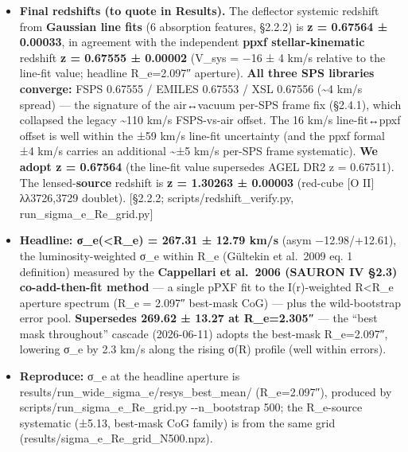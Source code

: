 \documentclass[
]{article}
\providecommand{\tightlist}{%
  \setlength{\itemsep}{0pt}\setlength{\parskip}{0pt}}
\newcommand{\BreakablePath}[1]{{\ttfamily\sloppy #1}}
\begin{document}
\begin{itemize}
\tightlist
\item
  \textbf{Final redshifts (to quote in Results).} The deflector systemic
  redshift from \textbf{Gaussian line fits} (6 absorption features,
  §2.2.2) is \textbf{z = 0.67564 ± 0.00033}, in agreement with the
  independent \textbf{ppxf stellar-kinematic} redshift \textbf{z =
  0.67555 ± 0.00002} (V\_sys = −16 ± 4 km/s relative to the line-fit
  value; headline R\_e=2.097″ aperture). \textbf{All three SPS libraries
  converge:} FSPS 0.67555 / EMILES 0.67553 / XSL 0.67556
  (\textasciitilde4 km/s spread) --- the signature of the air↔vacuum
  per-SPS frame fix (§2.4.1), which collapsed the legacy
  \textasciitilde110 km/s FSPS-vs-air offset. The 16 km/s line-fit↔ppxf
  offset is well within the ±59 km/s line-fit uncertainty (and the ppxf
  formal ±4 km/s carries an additional \textasciitilde±5 km/s per-SPS
  frame systematic). \textbf{We adopt z = 0.67564} (the line-fit value
  supersedes AGEL DR2 z = 0.67511). The lensed-\textbf{source} redshift
  is \textbf{z = 1.30263 ± 0.00003} (red-cube {[}O II{]} λλ3726,3729
  doublet). {[}§2.2.2;
  \BreakablePath{scripts/\discretionary{}{}{}redshift\_\discretionary{}{}{}verify.\discretionary{}{}{}py},
  \BreakablePath{run\_\discretionary{}{}{}sigma\_\discretionary{}{}{}e\_\discretionary{}{}{}Re\_\discretionary{}{}{}grid.\discretionary{}{}{}py}{]}
\item
  \textbf{Headline: σ\_e(\textless R\_e) = 267.31 ± 12.79 km/s} (asym
  −12.98/+12.61), the luminosity-weighted σ\_e within R\_e (Gültekin et
  al.~2009 eq. 1 definition) measured by the \textbf{Cappellari et
  al.~2006 (SAURON IV §2.3) co-add-then-fit method} --- a single pPXF
  fit to the I(r)-weighted R\textless R\_e aperture spectrum (R\_e =
  2.097″ best-mask CoG) --- plus the wild-bootstrap error pool.
  \textbf{Supersedes 269.62 ± 13.27 at R\_e=2.305″} --- the ``best mask
  throughout'' cascade (2026-06-11) adopts the best-mask R\_e=2.097″,
  lowering σ\_e by 2.3 km/s along the rising σ(R) profile (well within
  errors).
\item
  \textbf{Reproduce:} σ\_e at the headline aperture is
  \BreakablePath{results/\discretionary{}{}{}run\_\discretionary{}{}{}wide\_\discretionary{}{}{}sigma\_\discretionary{}{}{}e/\discretionary{}{}{}resys\_\discretionary{}{}{}best\_\discretionary{}{}{}mean/\discretionary{}{}{}}
  (R\_e=2.097″), produced by
  \BreakablePath{scripts/\discretionary{}{}{}run\_\discretionary{}{}{}sigma\_\discretionary{}{}{}e\_\discretionary{}{}{}Re\_\discretionary{}{}{}grid.\discretionary{}{}{}py -\discretionary{}{}{}-\discretionary{}{}{}n\_\discretionary{}{}{}bootstrap 500};
  the R\_e-source systematic (±5.13, best-mask CoG family) is from the
  same grid
  (\BreakablePath{results/\discretionary{}{}{}sigma\_\discretionary{}{}{}e\_\discretionary{}{}{}Re\_\discretionary{}{}{}grid\_\discretionary{}{}{}N500.\discretionary{}{}{}npz}).
\end{itemize}
\end{document}
